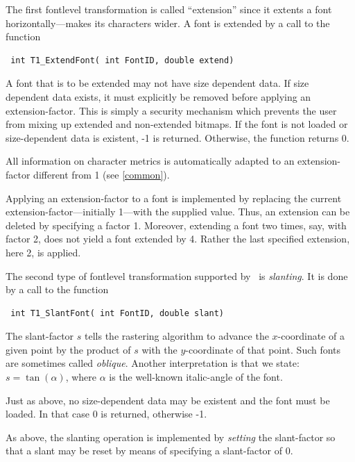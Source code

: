 The first fontlevel transformation is called ``extension'' since it extents a font
horizontally---makes its characters wider. A font is extended by a call to the
function
\precorr
\begin{verbatim}
 int T1_ExtendFont( int FontID, double extend)
\end{verbatim}\postcorr
A font that is to be extended may not have size dependent data. If size
dependent data exists, it must
explicitly be removed before applying an extension-factor. This is simply a
security mechanism which prevents the user from mixing up extended and
non-extended bitmaps. If the font is not loaded or size-dependent data is
existent, -1 is returned. Otherwise, the function returns 0.

All information on character metrics is automatically adapted to an
extension-factor different from 1 (see \ref{common}).

Applying an extension-factor to a font is implemented by replacing the current
extension-factor---initially 1---with the supplied value. Thus, an extension
can be deleted by specifying a factor 1. Moreover, extending a font two
times, say, with factor 2, does not yield a font extended by 4. Rather the
last specified extension, here 2, is applied.

The second type of fontlevel transformation supported by \tonelib\ is {\em
  slanting}.  It is done by a call to the function \precorr
\begin{verbatim}
 int T1_SlantFont( int FontID, double slant)
\end{verbatim}\postcorr
The slant-factor $s$ tells the rastering algorithm to advance the $x$-coordinate
of a given point by the product of $s$ with the $y$-coordinate of that
point. Such fonts are sometimes called {\em oblique}. Another interpretation
is that we state: $s=\tan(\alpha)$, where $\alpha$ is the well-known
italic-angle of the font. 

Just as above, no size-dependent data may be existent and the font must be
loaded. In that case 0 is returned, otherwise -1.

As above, the slanting operation is implemented by {\em setting} the
slant-factor so that a slant may be reset by means of specifying a
slant-factor of 0.

